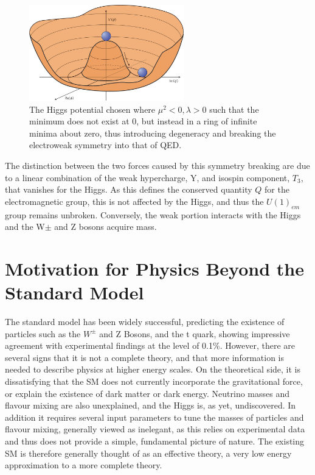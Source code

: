 \begin{figure}
\centering
\includegraphics[width=0.6\textwidth]{Figures/Theory/MHat}
\caption[The Higgs potential chosen where $\mu^{2} < 0, \lambda > 0$ introducing degeneracy and breaking the electroweak symmetry into that of QED.]{\label{fig:MexicanHat}The Higgs potential chosen where $\mu^{2} < 0, \lambda > 0$ such that the minimum does not exist at 0, but instead in a ring of infinite minima about zero, thus introducing degeneracy and breaking the electroweak symmetry into that of QED.~\cite{MexHat}}
\end{figure}

The distinction between the two forces caused by this symmetry breaking are due to a linear combination of the weak hypercharge, Y, and isospin component, $T_{3}$, that vanishes for the Higgs. As this defines the conserved quantity $Q$ for the electromagnetic group, this is not affected by the Higgs, and thus the $U(1)_{em}$ group remains unbroken. Conversely, the weak portion interacts with the Higgs and the W$\pm$ and Z bosons acquire mass.  

\section{Motivation for Physics Beyond the Standard Model}
The standard model has been widely successful, predicting the existence of particles such as the $W^{\pm}$ and Z Bosons, and the t quark, showing impressive agreement with experimental findings at the level of 0.1\%. However, there are several signs that it is not a complete theory, and that more information is needed to describe physics at higher energy scales. On the theoretical side, it is dissatisfying that the SM does not currently incorporate the gravitational force, or explain the existence of dark matter or dark energy. Neutrino masses and flavour mixing are also unexplained, and the Higgs is, as yet, undiscovered. In addition it requires several input parameters to tune the masses of particles and flavour mixing, generally viewed as inelegant, as this relies on experimental data and thus does not provide a simple, fundamental picture of nature.  The existing SM is therefore generally thought of as an effective theory, a very low energy approximation to a more complete theory\cite{PeskinSch}.

